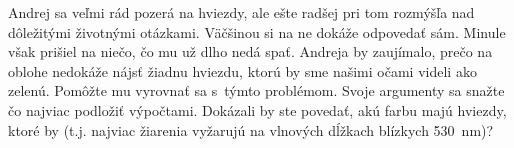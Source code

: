 Andrej sa veľmi rád pozerá na hviezdy, ale ešte radšej pri tom rozmýšľa nad dôležitými životnými otázkami.
Väčšinou si na ne dokáže odpovedať sám. Minule však prišiel na niečo, čo mu už dlho nedá spať.
Andreja by zaujímalo, prečo na oblohe nedokáže nájsť žiadnu hviezdu, ktorú by sme našimi očami videli ako zelenú.
Pomôžte mu vyrovnať sa s~týmto problémom. Svoje argumenty sa snažte čo najviac podložiť výpočtami.
Dokázali by ste povedať, akú farbu majú hviezdy, ktoré by 
(t.j. najviac žiarenia vyžarujú na vlnových dĺžkach blízkych \SI{530}{\nano\metre})? 